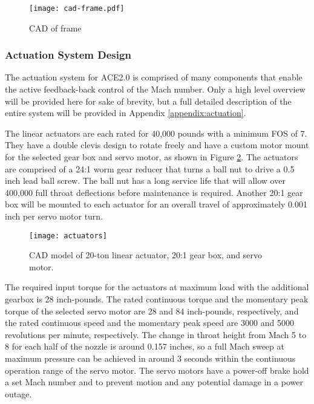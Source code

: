 \begin{figure}[ht!]
    \centering
    \texttt{[image: cad-frame.pdf]}
    \caption{CAD of frame}
    \label{fig:cad-frame}
\end{figure}

\subsubsection*{Actuation System Design}

The actuation system for ACE2.0 is comprised of many components that enable the active  feedback-back control of the Mach number. Only a high level overview will be provided here for sake of brevity, but a full detailed description of the entire system will be provided in Appendix \ref{appendix:actuation}. 

The linear actuators are each rated for 40,000 pounds with a minimum FOS of 7. They have a double clevis design to rotate freely and have a custom motor mount for the selected gear box and servo motor, as shown in Figure \ref{fig:actuators}. The actuators are comprised of a 24:1 worm gear reducer that turns a ball nut to drive a 0.5 inch lead ball screw. The ball nut has a long service life that will allow over 400,000 full throat deflections before maintenance is required. Another 20:1 gear box will be mounted to each actuator for an overall travel of approximately 0.001 inch per servo motor turn.

\begin{figure}[ht]
    \centering
    \texttt{[image: actuators]}
    \caption{CAD model of 20-ton linear actuator, 20:1 gear box, and servo motor.}
    \label{fig:actuators}
\end{figure}

The required input torque for the actuators at maximum load with the additional gearbox is 28 inch-pounds. The rated continuous torque and the momentary peak torque of the selected servo motor are 28 and 84 inch-pounds, respectively, and the rated continuous speed and the momentary peak speed are 3000 and 5000 revolutions per minute, respectively. The change in throat height from Mach 5 to 8 for each half of the nozzle is around 0.157 inches, so a full Mach sweep at maximum pressure can be achieved in around 3 seconds within the continuous operation range of the servo motor. The servo motors have a power-off brake hold a set Mach number and to prevent motion and any potential damage in a power outage.

